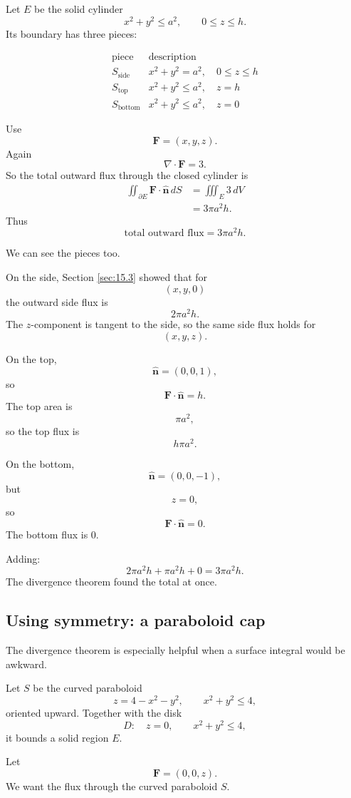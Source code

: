 Let \(E\) be the solid cylinder
\[
    x^2+y^2\le a^2,
    \qquad
    0\le z\le h.
\]
Its boundary has three pieces:

\[
\begin{array}{c|c}
\text{piece} & \text{description}\\ \hline
S_{\text{side}} & x^2+y^2=a^2,\quad 0\le z\le h\\[1mm]
S_{\text{top}} & x^2+y^2\le a^2,\quad z=h\\[1mm]
S_{\text{bottom}} & x^2+y^2\le a^2,\quad z=0
\end{array}
\]

Use
\[
    \mathbf F=(x,y,z).
\]
Again
\[
    \nabla\cdot\mathbf F=3.
\]
So the total outward flux through the closed cylinder is
\[
\begin{aligned}
\iint_{\partial E}\mathbf F\cdot\widehat{\mathbf n}\,dS
&=
\iiint_E 3\,dV\\
&=
3\pi a^2h.
\end{aligned}
\]
Thus
\[
\boxed{
    \text{total outward flux}=3\pi a^2h.
}
\]

We can see the pieces too.

On the side, Section \ref{sec:15.3} showed that for
\[
    (x,y,0)
\]
the outward side flux is
\[
    2\pi a^2h.
\]
The \(z\)-component is tangent to the side, so the same side flux holds for
\[
    (x,y,z).
\]

On the top,
\[
    \widehat{\mathbf n}=(0,0,1),
\]
so
\[
    \mathbf F\cdot\widehat{\mathbf n}=h.
\]
The top area is
\[
    \pi a^2,
\]
so the top flux is
\[
    h\pi a^2.
\]

On the bottom,
\[
    \widehat{\mathbf n}=(0,0,-1),
\]
but
\[
    z=0,
\]
so
\[
    \mathbf F\cdot\widehat{\mathbf n}=0.
\]
The bottom flux is \(0\).

Adding:
\[
    2\pi a^2h+\pi a^2h+0=3\pi a^2h.
\]
The divergence theorem found the total at once.

\subsection{Using symmetry: a paraboloid cap}

The divergence theorem is especially helpful when a surface integral would be awkward.

Let \(S\) be the curved paraboloid
\[
    z=4-x^2-y^2,
    \qquad
    x^2+y^2\le4,
\]
oriented upward.  Together with the disk
\[
    D:\quad z=0,\qquad x^2+y^2\le4,
\]
it bounds a solid region \(E\).

Let
\[
    \mathbf F=(0,0,z).
\]
We want the flux through the curved paraboloid \(S\).

